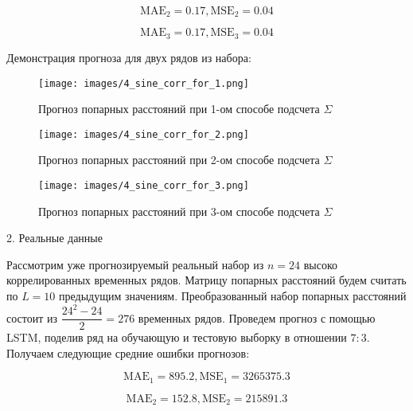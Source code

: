 \documentclass{article}
\begin{document}
\begin{equation}
    \text{MAE}_2 = 0.17, \text{MSE}_2 = 0.04
\end{equation}

\begin{equation}
    \text{MAE}_3 = 0.17, \text{MSE}_3 = 0.04
\end{equation}

Демонстрация прогноза для двух рядов из набора:

\newpage

\begin{figure}[h]
  \begin{minipage}{0.5\textwidth}
    \centering
    \texttt{[image: images/4\_sine\_corr\_for\_1.png]}
    \caption{Прогноз попарных расстояний при 1-ом способе подсчета $\Sigma$}
  \end{minipage}\hfill
  \begin{minipage}{0.5\textwidth}
    \centering
    \texttt{[image: images/4\_sine\_corr\_for\_2.png]}
    \caption{Прогноз попарных расстояний при 2-ом способе подсчета $\Sigma$}
  \end{minipage}
\end{figure}

\begin{figure}[h]
  \centering
  \begin{minipage}{0.5\textwidth}
    \centering
    \texttt{[image: images/4\_sine\_corr\_for\_3.png]}
    \caption{Прогноз попарных расстояний при 3-ом способе подсчета $\Sigma$}
  \end{minipage}\hfill
\end{figure}

2. Реальные данные 

Рассмотрим уже прогнозируемый реальный набор из $n = 24$ высоко коррелированных временных рядов. Матрицу попарных расстояний будем считать по $L = 10$ предыдущим значениям. Преобразованный набор попарных расстояний состоит из $\dfrac{24^2 - 24}{2} = 276$ временных рядов. Проведем прогноз с помощью LSTM, поделив ряд на обучающую и тестовую выборку в отношении $7 : 3$. Получаем следующие средние ошибки прогнозов:

\begin{equation}
    \text{MAE}_1 = 895.2, \text{MSE}_1 = 3265375.3
\end{equation}

\begin{equation}
    \text{MAE}_2 = 152.8, \text{MSE}_2 = 215891.3
\end{equation}
\end{document}
